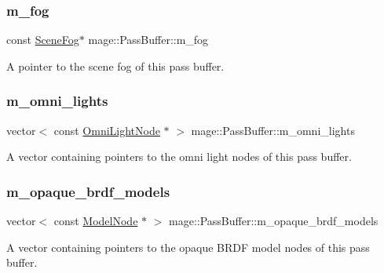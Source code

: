 \subsubsection{\texorpdfstring{m\+\_\+fog}{m\_fog}}
{\footnotesize\ttfamily const \hyperlink{structmage_1_1_scene_fog}{Scene\+Fog}$\ast$ mage\+::\+Pass\+Buffer\+::m\+\_\+fog\hspace{0.3cm}{\ttfamily [private]}}

A pointer to the scene fog of this pass buffer. \hypertarget{structmage_1_1_pass_buffer_ab4553bc8afe80eff1f52d511cd23e90b}{}\label{structmage_1_1_pass_buffer_ab4553bc8afe80eff1f52d511cd23e90b} 
\subsubsection{\texorpdfstring{m\+\_\+omni\+\_\+lights}{m\_omni\_lights}}
{\footnotesize\ttfamily vector$<$ const \hyperlink{namespacemage_a1724c6e6b6b5ba535cdd967cbbb4a669}{Omni\+Light\+Node} $\ast$ $>$ mage\+::\+Pass\+Buffer\+::m\+\_\+omni\+\_\+lights\hspace{0.3cm}{\ttfamily [private]}}

A vector containing pointers to the omni light nodes of this pass buffer. \hypertarget{structmage_1_1_pass_buffer_a7b866f3637755bfb2d951fe8a3495bea}{}\label{structmage_1_1_pass_buffer_a7b866f3637755bfb2d951fe8a3495bea} 
\subsubsection{\texorpdfstring{m\+\_\+opaque\+\_\+brdf\+\_\+models}{m\_opaque\_brdf\_models}}
{\footnotesize\ttfamily vector$<$ const \hyperlink{classmage_1_1_model_node}{Model\+Node} $\ast$ $>$ mage\+::\+Pass\+Buffer\+::m\+\_\+opaque\+\_\+brdf\+\_\+models\hspace{0.3cm}{\ttfamily [private]}}

A vector containing pointers to the opaque B\+R\+DF model nodes of this pass buffer. \hypertarget{structmage_1_1_pass_buffer_a6a2c8f757aca5b28eda0bec25f412e05}{}\label{structmage_1_1_pass_buffer_a6a2c8f757aca5b28eda0bec25f412e05} 
